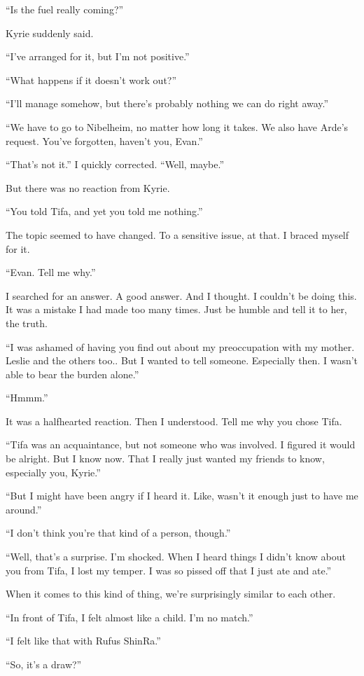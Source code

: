 \documentclass[oneside]{book}
\begin{document}
“Is the fuel really coming?”

Kyrie suddenly said.

“I’ve arranged for it, but I’m not positive.”

“What happens if it doesn’t work out?”

“I’ll manage somehow, but there’s probably nothing we can do right away.”

“We have to go to Nibelheim, no matter how long it takes. We also have Arde’s request. You’ve forgotten, haven’t you, Evan.”

“That’s not it.” I quickly corrected. “Well, maybe.”

But there was no reaction from Kyrie.

“You told Tifa, and yet you told me nothing.”

The topic seemed to have changed. To a sensitive issue, at that. I braced myself for it.

“Evan. Tell me why.”

I searched for an answer. A good answer. And I thought. I couldn’t be doing this. It was a mistake I had made too many times. Just be humble and tell it to her, the truth.

“I was ashamed of having you find out about my preoccupation with my mother. Leslie and the others too.. But I wanted to tell someone. Especially then. I wasn’t able to bear the burden alone.”

“Hmmm.”

It was a halfhearted reaction. Then I understood. Tell me why you chose Tifa.

“Tifa was an acquaintance, but not someone who was involved. I figured it would be alright. But I know now. That I really just wanted my friends to know, especially you, Kyrie.”

“But I might have been angry if I heard it. Like, wasn’t it enough just to have me around.”

“I don’t think you’re that kind of a person, though.”

“Well, that’s a surprise. I’m shocked. When I heard things I didn’t know about you from Tifa, I lost my temper. I was so pissed off that I just ate and ate.”

When it comes to this kind of thing, we’re surprisingly similar to each other.

“In front of Tifa, I felt almost like a child. I’m no match.”

“I felt like that with Rufus ShinRa.”

“So, it’s a draw?”
\end{document}
